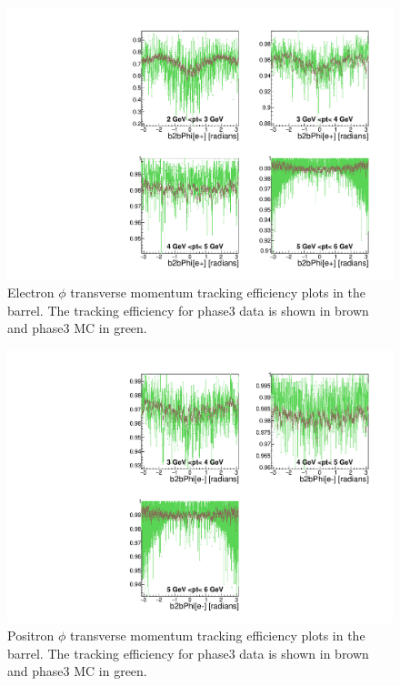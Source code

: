 \documentclass[a4paper,11pt,twosided,final,german,openbib,pdftex,listof=totoc,bibliography=totoc]{scrbook}
\begin{document}
\begin{figure}[!htbp]
	\centering
	\includegraphics[width=\textwidth]{Plots/master3/xPtMPhiemBarrelP3}
	\caption[Transverse Momentum $\phi$ Electron Barrel Efficiency Phase3]{Electron $\phi$ transverse momentum tracking efficiency plots in the barrel. The tracking efficiency for phase3 data is shown in brown and phase3 MC in green.}
	\label{plt:xPtMPhiemBarrel3}
\end{figure}



\begin{figure}[!htbp]
	\centering
	\includegraphics[width=\textwidth]{Plots/master3/xPtMPhiepBarrelP3}
	\caption[Transverse Momentum $\phi$ Positron Barrel Efficiency Phase3]{Positron $\phi$ transverse momentum tracking efficiency plots in the barrel. The tracking efficiency for phase3 data is shown in brown and phase3 MC in green.}
	\label{plt:xPtMPhiepBarrel3}
\end{figure}
\end{document}
